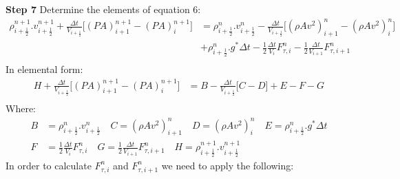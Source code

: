 \documentclass[11pt,letterpaper,titlepage]{article}
\newcommand{\half}{\frac{1}{2}}
\begin{document}
\newpage
\noindent
\textbf{Step 7}\newline
Determine the elements of equation 6:
\begin{equation*}
\begin{aligned}
\rho_{i+\half}^{n+1}.v_{i+\half}^{n+1} +\frac{\Delta t}{V_{i+\half}} \biggr[   (PA)_{i+1}^{n+1}-(PA)_{i}^{n+1}  \biggr]     &=\rho_{i+\half}^n.v_{i+\half}^n - \frac{\Delta t}{V_{i+\half}} \biggr[   (\rho Av^2)_{i+1}^n - (\rho Av^2)_{i}^n \biggr]\\
& +\rho_{i+\half}^n.g^*\Delta t -\half \frac{\Delta t}{V_i}F_{\tau,i}^n-\half \frac{\Delta t}{V_{i+1}}F_{\tau,i+1}^n\\
\end{aligned}
\end{equation*}
In elemental form:
\begin{equation*}
\begin{aligned}
H +\frac{\Delta t}{V_{i+\half}} \biggr[   (PA)_{i+1}^{n+1}-(PA)_{i}^{n+1}  \biggr]     &=B - \frac{\Delta t}{V_{i+\half}} \biggr[   C - D \biggr] +E -F-G\\
\end{aligned}
\end{equation*}
Where:
\begin{equation*}
\begin{aligned}
B&=\rho_{i+\half}^n.v_{i+\half}^n  \quad C=(\rho Av^2)_{i+1}^n  \quad D=(\rho Av^2)_{i}^n  \quad E=\rho_{i+\half}^n.g^*\Delta t \\ 
F&=\half \frac{\Delta t}{V_i}F_{\tau,i}^n  \quad G=\half \frac{\Delta t}{V_{i+1}}F_{\tau,i+1}^n  \quad
H=\rho_{i+\half}^{n+1}.v_{i+\half}^{n+1}
\end{aligned}
\end{equation*}
\newline
In order to calculate $F_{\tau,i}^n$ and $F_{\tau,i+1}^n$ we need to apply the following:
\end{document}

